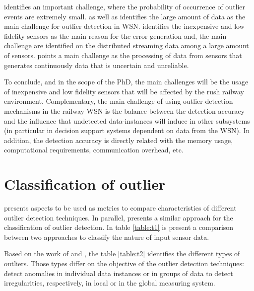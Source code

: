 \cite{class:branch:2006} identifies an important challenge, where the probability of occurrence of outlier events are extremely small. \cite{nn:abid:2016} as well as \cite{stat:sheng:2007} identifies the large amount of data as the main challenge for outlier detection in WSN. \cite{nn:zhuang:2006} identifies the inexpensive and low fidelity sensors as the main reason for the error generation and, the main challenge are identified on the distributed streaming data among a large amount of sensors. \cite{stat:ghorbel:2015} points a main challenge as the processing of data from sensors that generates continuously data that is uncertain and unreliable. 

To conclude, and in the scope of the PhD, the main challenges will be the usage of inexpensive and low fidelity sensors that will be affected by the rush railway environment. Complementary, the main challenge of using outlier detection mechanisms in the railway WSN is the balance between the detection accuracy and the influence that undetected data-instances will induce in other subsystems (in particular in decision support systems dependent on data from the WSN). In addition, the detection accuracy is directly related with the memory usage, computational requirements, communication overhead, etc. 


\newpage

\section{Classification of outlier}
\label{sec:classint}
\cite{gen:zhang:2010} presents aspects to be used as metrics to compare characteristics of different outlier detection techniques. In parallel, \cite{gen:chandola:2009} presents a similar approach for the classification of outlier detection. 
In table \ref{table:t1} is present a comparison between two approaches to classify the nature of input sensor data.

	

	

Based on the work of \cite{gen:zhang:2010} and \cite{gen:chandola:2009}, the table \ref{table:t2} identifies the different types of outliers. 
Those types differ on the objective of the outlier detection techniques: detect anomalies in individual data instances or in groups of data to detect irregularities, respectively, in local or in the global measuring system.



\newpage


